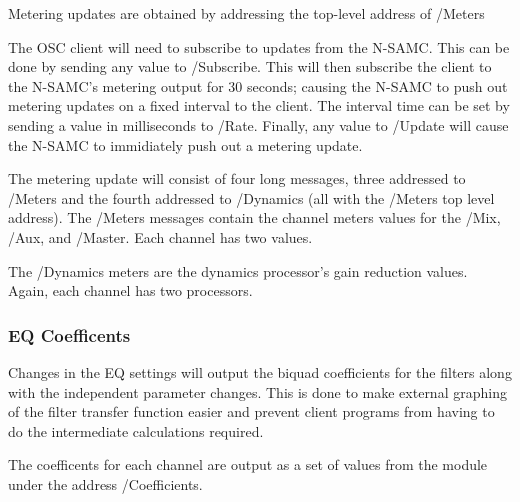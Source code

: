 \documentclass[letterpaper, 12pt, twosided, twocolumn]{article}
\begin{document}
Metering updates are obtained by addressing the top-level address of /Meters

The OSC client will need to subscribe to updates from the N-SAMC. This can be done by sending any value to /Subscribe. This will then subscribe the client to the N-SAMC's metering output for 30 seconds; causing the N-SAMC to push out metering updates on a fixed interval to the client. The interval time can be set by sending a value in milliseconds to /Rate. Finally, any value to /Update will cause the N-SAMC to immidiately push out a metering update.

The metering update will consist of four long messages, three addressed to /Meters and the fourth addressed to /Dynamics (all with the /Meters top level address). The /Meters messages contain the channel meters values for the /Mix, /Aux, and /Master. Each channel has two values.

The /Dynamics meters are the dynamics processor's gain reduction values. Again, each channel has two processors. 

\subsubsection{EQ Coefficents}

Changes in the EQ settings will output the biquad coefficients for the filters along with the independent parameter changes. This is done to make external graphing of the filter transfer function easier and prevent client programs from having to do the intermediate calculations required.

The coefficents for each channel are output as a set of values from the module under the address /Coefficients.
\end{document}
